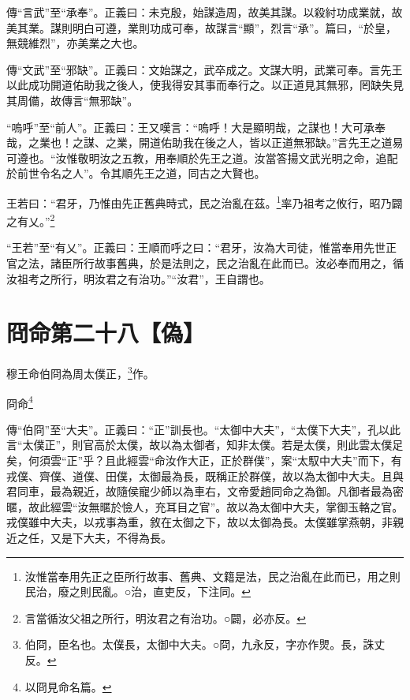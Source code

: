 {\noindent\zhuan{}\fzbyks 傳“言武”至“承奉”。正義曰：未克殷，始謀造周，故美其謀。以殺紂功成業就，故美其業。謀則明白可遵，業則功成可奉，故謀言“顯”，烈言“承”。篇曰，“於皇，無競維烈”，亦美業之大也。 \par}

{\noindent\zhuan{}\fzbyks 傳“文武”至“邪缺”。正義曰：文始謀之，武卒成之。文謀大明，武業可奉。言先王以此成功開道佑助我之後人，使我得安其事而奉行之。以正道見其無邪，罔缺失見其周備，故傳言“無邪缺”。 \par}

{\noindent\shu{}\fzkt “嗚呼”至“前人”。正義曰：王又嘆言：“嗚呼！大是顯明哉，之謀也！大可承奉哉，之業也！之謀、之業，開道佑助我在後之人，皆以正道無邪缺。”言先王之道易可遵也。“汝惟敬明汝之五教，用奉順於先王之道。汝當答揚文武光明之命，追配於前世令名之人”。令其順先王之道，同古之大賢也。 \par}

王若曰：“君牙，乃惟由先正舊典時式，民之治亂在茲。\footnote{汝惟當奉用先正之臣所行故事、舊典、文籍是法，民之治亂在此而已，用之則民治，廢之則民亂。○治，直吏反，下注同。}率乃祖考之攸行，昭乃闢之有乂。”\footnote{言當循汝父祖之所行，明汝君之有治功。○闢，必亦反。}

{\noindent\shu{}\fzkt “王若”至“有乂”。正義曰：王順而呼之曰：“君牙，汝為大司徒，惟當奉用先世正官之法，諸臣所行故事舊典，於是法則之，民之治亂在此而已。汝必奉而用之，循汝祖考之所行，明汝君之有治功。”“汝君”，王自謂也。 \par}

\section{冏命第二十八【偽】}


穆王命伯冏為周太僕正，\footnote{伯冏，臣名也。太僕長，太御中大夫。○冏，九永反，字亦作煛。長，誅丈反。}作。

冏命\footnote{以冏見命名篇。}


{\noindent\zhuan{}\fzbyks 傳“伯冏”至“大夫”。正義曰：“正”訓長也。“太御中大夫”，“太僕下大夫”，孔以此言“太僕正”，則官高於太僕，故以為太御者，知非太僕。若是太僕，則此雲太僕足矣，何須雲“正”乎？且此經雲“命汝作大正，正於群僕”，案“太馭中大夫”而下，有戎僕、齊僕、道僕、田僕，太御最為長，既稱正於群僕，故以為太御中大夫。且與君同車，最為親近，故隨侯寵少師以為車右，文帝愛趙同命之為御。凡御者最為密暱，故此經雲“汝無暱於憸人，充耳目之官”。故以為太御中大夫，掌御玉輅之官。戎僕雖中大夫，以戎事為重，敘在太御之下，故以太御為長。太僕雖掌燕朝，非親近之任，又是下大夫，不得為長。 \par}

